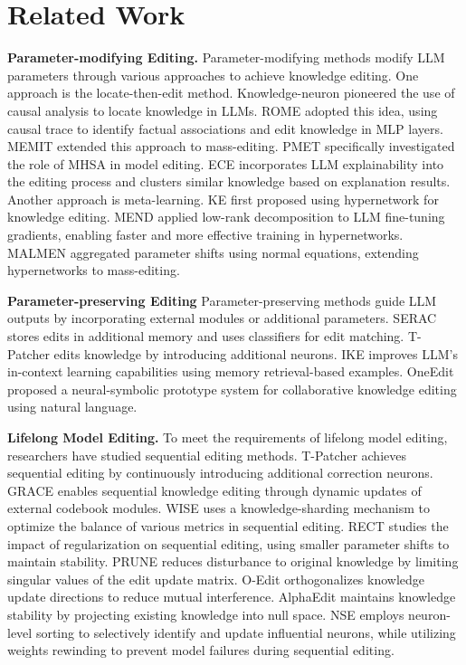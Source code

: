 \section{Related Work}
\label{app:related}
\textbf{Parameter-modifying Editing.} Parameter-modifying methods modify LLM parameters through various approaches to achieve knowledge editing. One approach is the locate-then-edit method. Knowledge-neuron \cite{knowledge-neuron} pioneered the use of causal analysis to locate knowledge in LLMs. ROME \cite{rome} adopted this idea, using causal trace to identify factual associations and edit knowledge in MLP layers. MEMIT \cite{memit} extended this approach to mass-editing. PMET \cite{pmet} specifically investigated the role of MHSA in model editing. ECE \cite{explainable} incorporates LLM explainability into the editing process and clusters similar knowledge based on explanation results. Another approach is meta-learning. KE \cite{editing-factual-knowledge} first proposed using hypernetwork for knowledge editing. MEND \cite{mend} applied low-rank decomposition to LLM fine-tuning gradients, enabling faster and more effective training in hypernetworks. MALMEN \cite{malmen} aggregated parameter shifts using normal equations, extending hypernetworks to mass-editing.

\textbf{Parameter-preserving Editing} Parameter-preserving methods guide LLM outputs by incorporating external modules or additional parameters. SERAC \cite{serac} stores edits in additional memory and uses classifiers for edit matching. T-Patcher \cite{transformerpatcher} edits knowledge by introducing additional neurons. IKE \cite{icl} improves LLM's in-context learning capabilities using memory retrieval-based examples. OneEdit \cite{oneedit} proposed a neural-symbolic prototype system for collaborative knowledge editing using natural language.

\textbf{Lifelong Model Editing.} To meet the requirements of lifelong model editing, researchers have studied sequential editing methods. T-Patcher \cite{transformerpatcher} achieves sequential editing by continuously introducing additional correction neurons. GRACE \cite{grace} enables sequential knowledge editing through dynamic updates of external codebook modules. WISE \cite{wise} uses a knowledge-sharding mechanism to optimize the balance of various metrics in sequential editing. RECT \cite{rect} studies the impact of regularization on sequential editing, using smaller parameter shifts to maintain stability. PRUNE \cite{prune} reduces disturbance to original knowledge by limiting singular values of the edit update matrix. O-Edit \cite{o-edit} orthogonalizes knowledge update directions to reduce mutual interference. AlphaEdit \cite{alphaedit} maintains knowledge stability by projecting existing knowledge into null space. NSE \cite{nse} employs neuron-level sorting to selectively identify and update influential neurons, while utilizing weights rewinding to prevent model failures during sequential editing.






